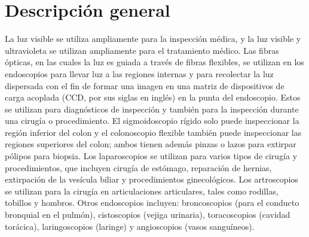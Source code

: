 \documentclass[12pt,a4paper]{book}
\begin{document}
\section{Descripción general}\label{sec:H1}

La luz visible se utiliza ampliamente para la inspección médica, y la luz visible y ultravioleta se utilizan ampliamente para el tratamiento médico. Las fibras ópticas, en las cuales la luz es guiada a través de fibras flexibles, se utilizan en los endoscopios para llevar luz a las regiones internas y para recolectar la luz dispersada con el fin de formar una imagen en una matriz de dispositivos de carga acoplada (CCD, por sus siglas en inglés) en la punta del endoscopio. Estos se utilizan para diagnósticos de inspección y también para la inspección durante una cirugía o procedimiento. El sigmoidoscopio rígido solo puede inspeccionar la región inferior del colon y el colonoscopio flexible también puede inspeccionar las regiones superiores del colon; ambos tienen además pinzas o lazos para extirpar pólipos para biopsia. Los laparoscopios se utilizan para varios tipos de cirugía y procedimientos, que incluyen cirugía de estómago, reparación de hernias, extirpación de la vesícula biliar y procedimientos ginecológicos. Los artroscopios se utilizan para la cirugía en articulaciones articulares, tales como rodillas, tobillos y hombros. Otros endoscopios incluyen: broncoscopios (para el conducto bronquial en el pulmón), cistoscopios (vejiga urinaria), toracoscopios (cavidad torácica), laringoscopios (laringe) y angioscopios (vasos sanguíneos).
\end{document}
